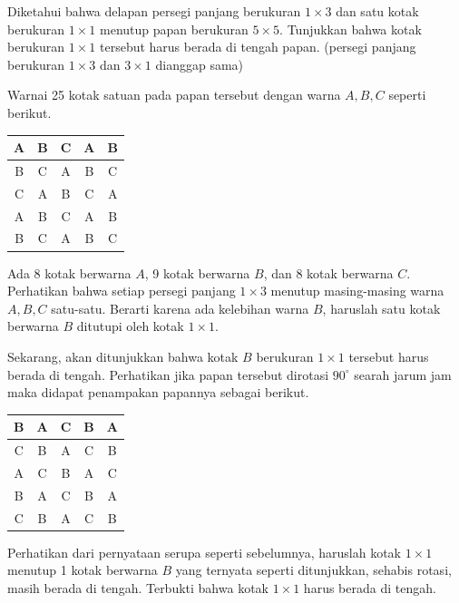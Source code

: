 \documentclass[12pt]{scrartcl}
\begin{document}
\begin{soaljawab}
    Diketahui bahwa delapan persegi panjang berukuran $1 \times 3$ dan satu kotak berukuran $1 \times 1$ menutup papan berukuran $5 \times 5$. Tunjukkan bahwa kotak berukuran $1 \times 1$ tersebut harus berada di tengah papan. (persegi panjang berukuran $1 \times 3$ dan $3 \times 1$ dianggap sama)
    \begin{solusi}
    Warnai 25 kotak satuan pada papan tersebut dengan warna $A,B,C$ seperti berikut.
        \begin{center}
        \begin{tabular}{ |c|c|c|c|c| }
			\hline
			A & B & C & A & B \\
			\hline
			B & C & A & B & C \\
			\hline
			C & A & B & C & A \\
			\hline
			A & B & C & A & B \\
			\hline
			B & C & A & B & C \\
			\hline
		\end{tabular}
        \end{center}
        Ada 8 kotak berwarna $A$, 9 kotak berwarna $B$, dan $8$ kotak berwarna $C$. Perhatikan bahwa setiap persegi panjang $1 \times 3$ menutup masing-masing warna $A,B,C$ satu-satu. Berarti karena ada kelebihan warna $B$, haruslah satu kotak berwarna $B$ ditutupi oleh kotak $1 \times 1$.
        
        Sekarang, akan ditunjukkan bahwa kotak $B$ berukuran $1 \times 1$ tersebut harus berada di tengah. Perhatikan jika papan tersebut dirotasi $90^\circ$ searah jarum jam maka didapat penampakan papannya sebagai berikut.
        \begin{center}
        \begin{tabular}{ |c|c|c|c|c| }
		\hline
		B & A & C & B & A \\
		\hline
		C & B & A & C & B \\
		\hline
		A & C & B & A & C \\
		\hline
		B & A & C & B & A \\
		\hline
		C & B & A & C & B \\
		\hline
	\end{tabular}
        \end{center}
        Perhatikan dari pernyataan serupa seperti sebelumnya, haruslah kotak $1 \times 1$ menutup 1 kotak berwarna $B$ yang ternyata seperti ditunjukkan, sehabis rotasi, masih berada di tengah. Terbukti bahwa kotak $1 \times 1$ harus berada di tengah.
    \end{solusi}
\end{soaljawab}
\end{document}
